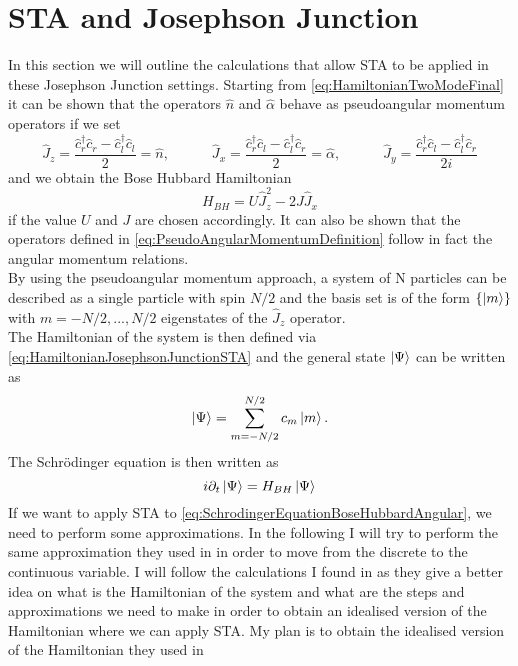 \section{STA and Josephson Junction}
In this section we will outline the calculations that allow STA to be applied in these Josephson Junction settings.
Starting from \cref{eq:HamiltonianTwoModeFinal} it can be shown that the operators $ \hat{n} $ and $ \hat{ \alpha } $ behave as pseudoangular momentum operators if we set  
\begin{equation}
\label{eq:PseudoAngularMomentumDefinition}
\hat{J}_z = \frac{\hat{c}_{r}^{\dagger}\hat{c}_{r} - \hat{c}_{l}^{\dagger}\hat{c}_{l}}{2} = \hat{n},\hspace{3em} \hat{J}_x =\frac{\hat{c}_{r}^{\dagger}\hat{c}_{l} - \hat{c}_{l}^{\dagger}\hat{c}_{r}}{2} =  \hat{ \alpha }  ,\hspace{3em}  \hat{J}_y = \frac{\hat{c}_{r}^{\dagger}\hat{c}_{l} - \hat{c}_{l}^{\dagger}\hat{c}_{r}}{2i} 
\end{equation}
and we obtain the Bose Hubbard Hamiltonian 
\begin{equation}
\label{eq:HamiltonianJosephsonJunctionSTA}
H_{BH} =  U \hat{J}_z^2 - 2J\hat{J}_x 
\end{equation}
if the value $ U $ and $ J $ are chosen accordingly.
It can also be shown that the operators defined in \cref{eq:PseudoAngularMomentumDefinition} follow in fact the angular momentum relations.\\
By using the pseudoangular momentum approach, a system of N particles can be described as a single particle with spin $ N/2 $ and the basis set is of the form $ \{\ket{m}\} $ with $ m = -N/2, ..., N/2 $ eigenstates of the $ \hat{J}_{z} $ operator.\\
The Hamiltonian of the system is then defined via \cref{eq:HamiltonianJosephsonJunctionSTA} and the general state $ \ket{\Psi} $ can be written as 
\begin{equation}
\label{eq:GeneralStateAngularMomentum}
\ket{\Psi} = \sum_{m = -N/2}^{N/2} c_{m}\ket{m}.
\end{equation}
The Schr{\"o}dinger equation is then written as 
\begin{equation}
\label{eq:SchrodingerEquationBoseHubbardAngular}
	i\partial_t \ket{\Psi} = H_{BH}\ket{\Psi} 
\end{equation}
If we want to apply STA to \cref{eq:SchrodingerEquationBoseHubbardAngular}, we need to perform some approximations.
In the following I will try to perform the same approximation they used in \cite{BoseEinsteinCJulia2010} in order to move from the discrete to the continuous variable.
I will follow the calculations I found in \cite{BoseEinsteinCJulia2010} as they give a better idea on what is the Hamiltonian of the system and what are the steps and approximations we need to make in order to obtain an idealised version of the Hamiltonian where we can apply STA.
My plan is to obtain the idealised version of the Hamiltonian they used in \cite{FastGenerationJulia2012}

